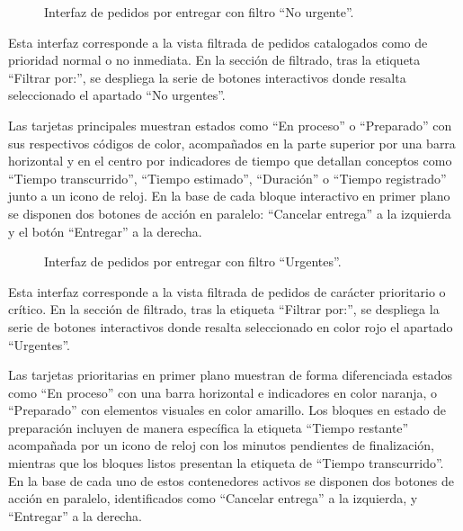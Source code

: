 \begin{figure}[H]
    \centering
    
    \caption{Interfaz de pedidos por entregar con filtro ``No urgente''.}
    \label{fig:ui-ent-02-no-urgentes}
\end{figure}

Esta interfaz corresponde a la vista filtrada de pedidos catalogados como de prioridad normal o no inmediata. En la sección de filtrado, tras la etiqueta ``Filtrar por:'', se despliega la serie de botones interactivos donde resalta seleccionado el apartado ``No urgentes''. 

Las tarjetas principales muestran estados como ``En proceso'' o ``Preparado'' con sus respectivos códigos de color, acompañados en la parte superior por una barra horizontal y en el centro por indicadores de tiempo que detallan conceptos como ``Tiempo transcurrido'', ``Tiempo estimado'', ``Duración'' o ``Tiempo registrado'' junto a un icono de reloj. En la base de cada bloque interactivo en primer plano se disponen dos botones de acción en paralelo: ``Cancelar entrega'' a la izquierda y el botón ``Entregar'' a la derecha.

\begin{figure}[H]
    \centering
    
    \caption{Interfaz de pedidos por entregar con filtro ``Urgentes''.}
    \label{fig:ui-ent-02-urgentes}
\end{figure}

Esta interfaz corresponde a la vista filtrada de pedidos de carácter prioritario o crítico. En la sección de filtrado, tras la etiqueta ``Filtrar por:'', se despliega la serie de botones interactivos donde resalta seleccionado en color rojo el apartado ``Urgentes''. 

Las tarjetas prioritarias en primer plano muestran de forma diferenciada estados como ``En proceso'' con una barra horizontal e indicadores en color naranja, o ``Preparado'' con elementos visuales en color amarillo. Los bloques en estado de preparación incluyen de manera específica la etiqueta ``Tiempo restante'' acompañada por un icono de reloj con los minutos pendientes de finalización, mientras que los bloques listos presentan la etiqueta de ``Tiempo transcurrido''. En la base de cada uno de estos contenedores activos se disponen dos botones de acción en paralelo, identificados como ``Cancelar entrega'' a la izquierda, y ``Entregar'' a la derecha.

